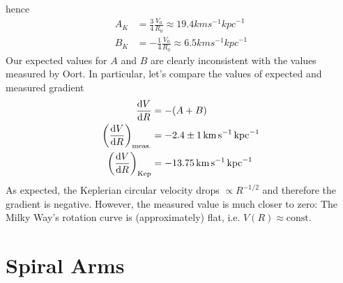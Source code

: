 hence 
\begin{align*}
    A_{K} &= \frac{3}{4}\frac{V_{0}}{R_{0}} \approx 19.4\unit{km}\unit{s}^{-1}\unit{kpc}^{-1}\\
    B_{K} &= -\frac{1}{4}\frac{V_{0}}{R_{0}} \approx 6.5\unit{km}\unit{s}^{-1}\unit{kpc}^{-1}
\end{align*}
Our expected values for $A$ and $B$ are clearly inconsistent with the values measured by Oort. In particular, let’s compare the values of expected and measured gradient
\begin{align*}
    \frac{\text{d}V}{\text{d}R} &= -(A+B)\\
    \left(\frac{\text{d}V}{\text{d}R}\right)_{\text{meas.}} &= -2.4\pm 1\,\text{km}\,\text{s}^{-1}\,\text{kpc}^{-1}\\
    \left(\frac{\text{d}V}{\text{d}R}\right)_{\text{Kep}} &= -13.75\,\text{km}\,\text{s}^{-1}\,\text{kpc}^{-1}
\end{align*}
As expected, the Keplerian circular velocity drops $\propto R^{-1/2}$ and therefore the gradient is negative. However, the measured value is much closer to zero: The Milky Way’s rotation curve is (approximately) flat, i.e. $V(R)\approx \text{const.}$

\section{Spiral Arms}

